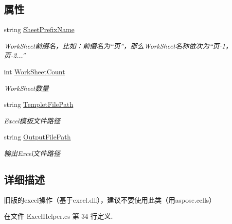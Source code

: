 \subsection*{属性}
\begin{DoxyCompactItemize}
\item 
string \hyperlink{class_x_c_l_net_tools_1_1_data_handler_1_1_excel_helper_a19d5234b9309942b87041f70bef91647}{Sheet\-Prefix\-Name}
\begin{DoxyCompactList}\small\item\em Work\-Sheet前缀名，比如：前缀名为“页”，那么\-Work\-Sheet名称依次为“页-\/1，页-\/2...” \end{DoxyCompactList}\item 
int \hyperlink{class_x_c_l_net_tools_1_1_data_handler_1_1_excel_helper_ab8d2677869ff64e25bbe54623ef9fa86}{Work\-Sheet\-Count}
\begin{DoxyCompactList}\small\item\em Work\-Sheet数量 \end{DoxyCompactList}\item 
string \hyperlink{class_x_c_l_net_tools_1_1_data_handler_1_1_excel_helper_a0e4501c60ef6446d0fe8151a6e58fca4}{Templet\-File\-Path}
\begin{DoxyCompactList}\small\item\em Excel模板文件路径 \end{DoxyCompactList}\item 
string \hyperlink{class_x_c_l_net_tools_1_1_data_handler_1_1_excel_helper_ada3dfa77cf3ac278ee83281f04707aa3}{Output\-File\-Path}
\begin{DoxyCompactList}\small\item\em 输出\-Excel文件路径 \end{DoxyCompactList}\end{DoxyCompactItemize}


\subsection{详细描述}
旧版的excel操作（基于excel.\-dll），建议不要使用此类（用aspose.\-cells） 



在文件 Excel\-Helper.\-cs 第 34 行定义.



